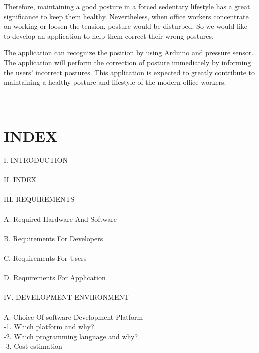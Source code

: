 \documentclass[conference]{IEEEtran}
\begin{document}
Therefore, maintaining a good posture in a forced sedentary lifestyle has a great significance to keep them healthy. Nevertheless, when office workers concentrate on working or loosen the tension, posture would be disturbed. So we would like to develop an application to help them correct their wrong postures.

The application can recognize the position by using Arduino and pressure sensor. The application will perform the correction of posture immediately by informing the users' incorrect postures. This application is expected to greatly contribute to maintaining a healthy posture and lifestyle of the modern office workers. 
\\\\\\


\clearpage

\section{INDEX}

I. INTRODUCTION\\\\

II. INDEX\\\\

III. REQUIREMENTS\\\\
A. Required Hardware And Software\\\\
B. Requirements For Developers\\\\
C. Requirements For Users\\\\
D. Requirements For Application\\\\


IV. DEVELOPMENT ENVIRONMENT\\\\
A. Choice Of software Development Platform\\

-1. Which platform and why?\\

-2. Which programming language and why?\\

-3. Cost estimation\\
\end{document}

